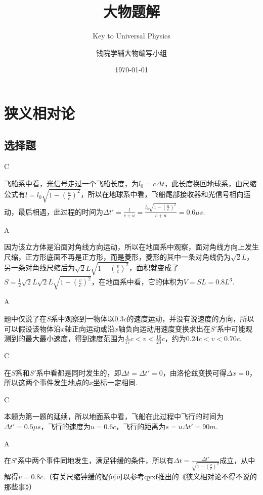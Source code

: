 \documentclass[b5paper,opensource]{./template/qyxf-book}
\title{大物题解}
\subtitle{Key to Universal Physics}
\author{钱院学辅大物编写小组}
\date{\today}
\begin{document}
\chapter{狭义相对论}  %
\section{选择题}  %

C  %

飞船系中看，光信号走过一个飞船长度，为$l_0=c\Delta t$，此长度换回地球系，由尺缩公式有$l=l_0\sqrt{1-(\frac{u}{c})^2}$，所以在地球系中看，飞船尾部接收器和光信号相向运动，最后相遇，此过程的时间为$\Delta t'=\frac{l}{c+u}=\frac{l_0\sqrt{1-(\frac{u}{c})^2}}{c+u}=0.6\mu s$.

A

\solve
因为该立方体是沿面对角线方向运动，所以在地面系中观察，面对角线方向上发生尺缩，正方形底面不再是正方形，而是菱形，菱形的其中一条对角线仍为$\sqrt{2}L$，另一条对角线尺缩后为$\sqrt{2}L\sqrt{1-(\frac{v}{c})^2}$，面积就变成了$S=\frac{1}{2}\sqrt{2}L\sqrt{2}L\sqrt{1-(\frac{v}{c})^2}$，在地面系中看，它的体积为$V=SL=0.8L^3$.

A

\solve
题中仅说了在$S$系中观察到一物体以$0.3c$的速度运动，并没有说速度的方向，所以可以假设该物体沿$x$轴正向运动或沿$x$轴负向运动用速度变换求出在$S'$系中可能观测到的最大最小速度，得到速度范围为$\frac{4}{17}c<v<\frac{16}{23}c$，约为$0.24c<v<0.70c$.

C

\solve
在$S$系和$S'$系中看都是同时发生的，即$\Delta t=\Delta t'=0$，由洛伦兹变换可得$\Delta x=0$，所以这两个事件发生地点的$x$坐标一定相同.

C

\solve
本题为第一题的延续，所以地面系中看，飞船在此过程中飞行的时间为$\Delta t'=0.5\mu s$，飞行的速度为$u=0.6c$，飞行的距离为$s=u\Delta t'=90m$.

A

\solve
在$S'$系中两个事件同地发生，满足钟缓的条件，所以有$\Delta t=\frac{\Delta t'}{\sqrt{1-(\frac{v}{c})^2}}$成立，从中解得$v=0.8c$.（有关尺缩钟缓的疑问可以参考qyxf推出的《狭义相对论不得不说的那些事》）
\end{document}
